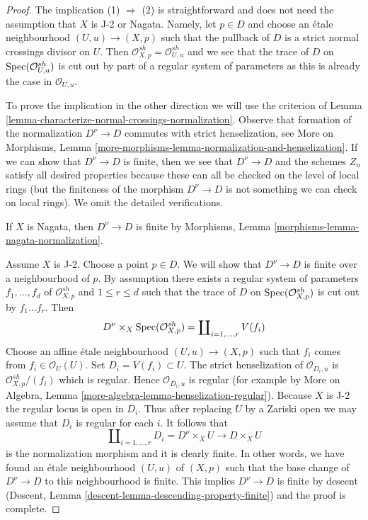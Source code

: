 \begin{proof}
The implication (1) $\Rightarrow$ (2) is straightforward and
does not need the assumption that $X$ is J-2 or Nagata.
Namely, let $p \in D$ and choose an \'etale neighbourhood
$(U, u) \to (X, p)$ such that the pullback of $D$ is
a strict normal crossings divisor on $U$.
Then $\mathcal{O}_{X, p}^{sh} = \mathcal{O}_{U, u}^{sh}$
and we see that the trace of $D$ on $\mathop{\mathrm{Spec}}(\mathcal{O}_{U, u}^{sh})$
is cut out by part of a regular system of parameters
as this is already the case in $\mathcal{O}_{U, u}$.

\medskip\noindent
To prove the implication in the other direction
we will use the criterion of
Lemma \ref{lemma-characterize-normal-crossings-normalization}.
Observe that formation of the normalization $D^\nu \to D$
commutes with strict henselization, see
More on Morphisms, Lemma
\ref{more-morphisms-lemma-normalization-and-henselization}.
If we can show that $D^\nu \to D$ is finite,
then we see that $D^\nu \to D$ and the schemes
$Z_n$ satisfy all desired properties because these
can all be checked on the level of local rings
(but the finiteness of the morphism $D^\nu \to D$
is not something we can check on local rings).
We omit the detailed verifications.

\medskip\noindent
If $X$ is Nagata, then $D^\nu \to D$ is finite by
Morphisms, Lemma \ref{morphisms-lemma-nagata-normalization}.

\medskip\noindent
Assume $X$ is J-2. Choose a point $p \in D$. We will show
that $D^\nu \to D$ is finite over a neighbourhood of $p$.
By assumption there exists a regular system of
parameters $f_1, \ldots, f_d$ of $\mathcal{O}_{X, p}^{sh}$
and $1 \leq r \leq d$ such that the trace of $D$ on
$\mathop{\mathrm{Spec}}(\mathcal{O}_{X, p}^{sh})$ is cut out by $f_1 \ldots f_r$.
Then
$$
D^\nu \times_X \mathop{\mathrm{Spec}}(\mathcal{O}_{X, p}^{sh}) = 
\coprod\nolimits_{i = 1, \ldots, r} V(f_i)
$$
Choose an affine \'etale neighbourhood
$(U, u) \to (X, p)$ such that $f_i$ comes from
$f_i \in \mathcal{O}_U(U)$. Set $D_i = V(f_i) \subset U$.
The strict henselization of $\mathcal{O}_{D_i, u}$
is $\mathcal{O}_{X, p}^{sh}/(f_i)$ which is regular.
Hence $\mathcal{O}_{D_i, u}$ is regular (for example by
More on Algebra, Lemma \ref{more-algebra-lemma-henselization-regular}).
Because $X$ is J-2 the regular locus is open in $D_i$.
Thus after replacing $U$ by a Zariski open we may assume
that $D_i$ is regular for each $i$. It follows that
$$
\coprod\nolimits_{i = 1, \ldots, r} D_i = D^\nu \times_X U
\longrightarrow D \times_X U
$$
is the normalization morphism and it is clearly finite.
In other words, we have found
an \'etale neighbourhood $(U, u)$ of $(X, p)$ such that
the base change of $D^\nu \to D$ to this neighbourhood is finite.
This implies $D^\nu \to D$ is finite by descent
(Descent, Lemma \ref{descent-lemma-descending-property-finite})
and the proof is complete.
\end{proof}













